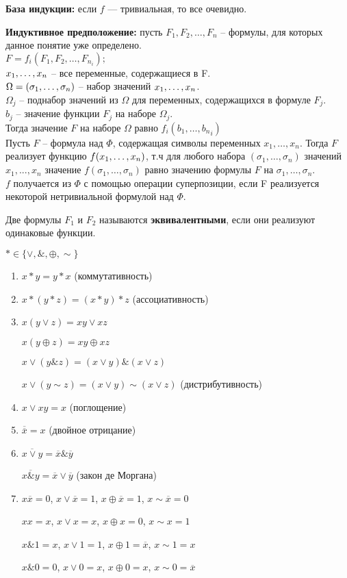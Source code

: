 \textbf{База индукции:} если $f$ --- тривиальная, то все очевидно.

\textbf{Индуктивное предположение:} пусть $F_1,F_2, \ldots, F_n$ -- формулы, для которых данное понятие уже определено. \\
$F=f_i(F_1,F_2, \ldots, {F_{n_i}});$ \\
$x_1, \ldots, x_n$ -- все переменные, содержащиеся в F. \\
$\Omega=(\sigma_1, \ldots, \sigma_n)$ -- набор значений $x_1, \ldots, x_n$. \\
$\Omega_j$ -- поднабор значений из $\Omega$ для переменных, содержащихся в формуле $F_j$. \\
$b_j$ -- значение функции $F_j$ на наборе $\Omega_j$. \\
Тогда значение $F$ на наборе $\Omega$ равно $f_i(b_1, \ldots, {b_n}_i)$ \\
Пусть $F$ -- формула над $\Phi$, содержащая символы переменных $x_1, \ldots, x_n$. Тогда $F$ реализует функцию $f(x_1, \ldots, x_n)$, т.ч для любого набора $(\sigma_1, \ldots, \sigma_n)$ значений $x_1,...,x_n$ значение $f(\sigma_1, \ldots, \sigma_n)$ равно значению формулы $F$ на $\sigma_1, \ldots, \sigma_n$. \\
$f$ получается из $\Phi$ с помощью операции суперпозиции, если F реализуется некоторой нетривиальной формулой над $\Phi$.

\begin{definition}
Две формулы $F_1$ и $F_2$ называются {\bf эквивалентными}, если они реализуют одинаковые функции.
\end{definition}


$\ast \in \{\vee, \&, \oplus, \sim \}$

\begin{enumerate}
	\item 
		$x \ast y = y \ast x$ (коммутативность)
	\item 
		$x \ast (y \ast z) = (x \ast y) \ast z$ (ассоциативность)
	\item 
		$x (y \vee z) = xy \vee xz$

		$x (y \oplus z) = xy \oplus xz$

		$x \vee (y  \&  z) = (x \vee y) \& (x \vee z)$

		$x \vee (y  \sim  z) = (x \vee y) \sim (x \vee z)$ (дистрибутивность)
	\item
		$x \vee xy = x$ (поглощение)
	\item 
		$\overline{\overline{x}} = x$ (двойное отрицание)
	\item 
		$\overline{x \vee y} = \overline{x} \& \overline{y}$

		$\overline{x \& y} = \overline{x} \vee \overline{y}$ (закон де Моргана)
	\item 
		$x\overline{x} = 0$, \smallskip $x \vee \overline{x} = 1$, \smallskip $x \oplus \overline{x} = 1$, \smallskip $x \sim \overline{x} = 0$

		$xx = x$, \smallskip $x \vee x = x$, \smallskip $x \oplus x = 0$, \smallskip $x \sim x = 1$

		$x \& 1 = x$, \smallskip $x \vee 1 = 1$, \smallskip $x \oplus 1 = \overline{x}$, \smallskip $x \sim 1 = x$

		$x \& 0 = 0$, \smallskip $x \vee 0 = x$, \smallskip $x \oplus 0 = x$, \smallskip $x \sim 0 = \overline{x}$
\end{enumerate}